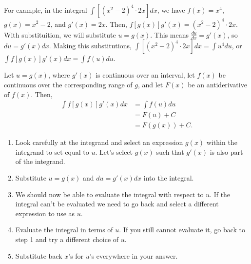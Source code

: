 \noindent For example, in the integral $\displaystyle\int \left[(x^2-2)^4\cdot 2x\right] dx$, we have $f(x)=x^4$, $g(x)=x^2-2$, and $g'(x)=2x$. Then, $f[g(x)]g'(x)=(x^2-2)^4\cdot 2x$. With substituition, we will substitute $u=g(x)$. This means $\displaystyle\frac{du}{dx}=g'(x)$, so $du=g'(x) dx$. Making this substitutions, $\displaystyle\int \left[(x^2-2)^4\cdot 2x\right] dx=\displaystyle\int u^4 du$, or $\displaystyle\int f[g(x)]g'(x) dx=\int f(u) du$.
\vspace{0.5cm}
\begin{tcolorbox}[title = {Theorem: Substitution with Indefinite Integrals}{\hypersetup{linkcolor=white}\footnotemark}]

\noindent Let $u=g(x)$, where $g'(x)$ is continuous over an interval, let $f(x)$ be continuous over the corresponding range of $g$, and let $F(x)$ be an antiderivative of $f(x)$. Then, 
\begin{equation}
\begin{split}
    \int f[g(x)]g'(x) dx&=\int f(u) du\\
    &=F(u)+C\\
    &=F(g(x))+C.
\end{split}
\end{equation}

\end{tcolorbox}
\vspace{0.5cm}
\begin{tcolorbox}[title={Problem-Solving Strategy: Integration by Substitution}]
\begin{enumerate}[leftmargin=*]
    \item Look carefully at the integrand and select an expression $g(x)$ within the integrand to set equal to $u$. Let's select $g(x)$ such that $g'(x)$ is also part of the integrand.
    \item Substitute $u=g(x)$ and $du=g'(x) dx$ into the integral.
    \item We should now be able to evaluate the integral with respect to $u$. If the integral can't be evaluated we need to go back and select a different expression to use as $u$.
    \item Evaluate the integral in terms of $u$. If you still cannot evaluate it, go back to step 1 and try a different choice of $u$.
    \item Substitute back $x$'s for $u$'s everywhere in your answer.
\end{enumerate}
\end{tcolorbox}
